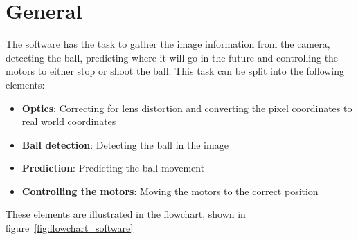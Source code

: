 \section{General}\label{sec:general}
The software has the task to gather the image information from the camera, detecting the ball, predicting where it will go in the future and controlling the motors to either stop or shoot the ball.
This task can be split into the following elements:
\begin{itemize}
    \item \textbf{Optics}: Correcting for lens distortion and converting the pixel coordinates to real world coordinates
    \item \textbf{Ball detection}: Detecting the ball in the image
    \item \textbf{Prediction}: Predicting the ball movement
    \item \textbf{Controlling the motors}: Moving the motors to the correct position
\end{itemize}
These elements are illustrated in the flowchart, shown in figure~\ref{fig:flowchart_software}
%

